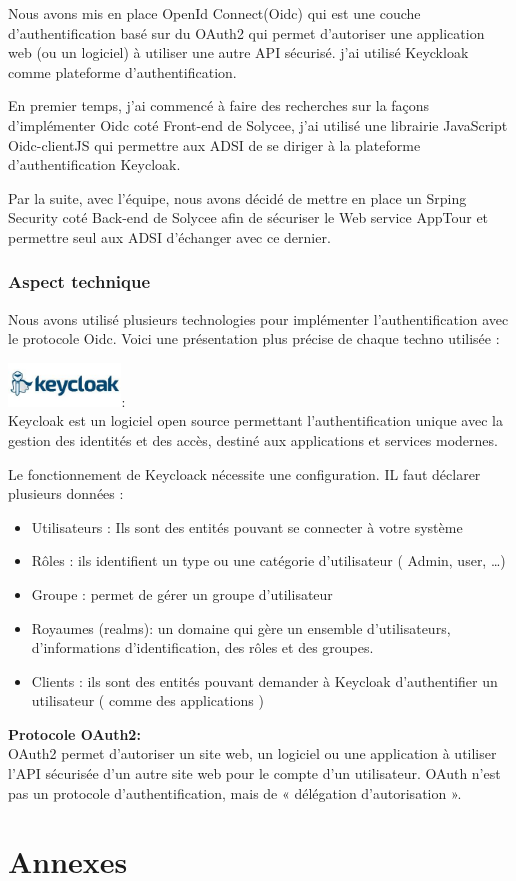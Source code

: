 \documentclass[12pt]{article}
\begin{document}
Nous avons mis en place OpenId Connect(Oidc) qui est une couche d'authentification basé sur du OAuth2 qui permet d'autoriser une application web (ou un logiciel) à utiliser une autre API sécurisé. j'ai utilisé Keyckloak comme plateforme d'authentification. 

En premier temps, j'ai commencé à faire des recherches sur la façons d'implémenter Oidc coté Front-end de Solycee, j'ai utilisé une librairie JavaScript Oidc-clientJS qui permettre aux ADSI de se diriger à la plateforme d'authentification Keycloak.

Par la suite, avec l'équipe, nous avons décidé de mettre en place un Srping Security coté Back-end de Solycee afin de sécuriser le Web service AppTour et permettre seul aux ADSI d'échanger avec ce dernier.  
 
\subsubsection{Aspect technique}

Nous avons utilisé plusieurs technologies pour implémenter l'authentification avec le protocole Oidc. Voici une présentation plus précise de chaque techno utilisée : 

\includegraphics[width=30mm,scale=0.5]{diagrammes/logo_Keycloak.jpeg}: \\

Keycloak  est un logiciel open source permettant l'authentification unique avec la gestion des identités et des accès, destiné aux applications et services modernes. 

Le fonctionnement de Keycloack nécessite une configuration. IL faut déclarer plusieurs données : 
\begin{itemize}
\item Utilisateurs : Ils sont des entités pouvant se connecter à votre système
\item Rôles : ils identifient un type ou une catégorie d’utilisateur ( Admin, user, …)
\item Groupe : permet de gérer un groupe d’utilisateur
\item Royaumes (realms): un domaine qui gère un ensemble d’utilisateurs, d’informations d’identification, des rôles et des groupes.
\item Clients : ils sont des entités pouvant demander à Keycloak d’authentifier un utilisateur ( comme des applications )
\end{itemize}
 
\textbf{Protocole OAuth2:}\\ 

OAuth2 permet d'autoriser un site web, un logiciel ou une application à utiliser l'API sécurisée d'un autre site web pour le compte d'un utilisateur. OAuth n'est pas un protocole d'authentification, mais de « délégation d'autorisation ».


\newpage
\section{Annexes}
\end{document}
